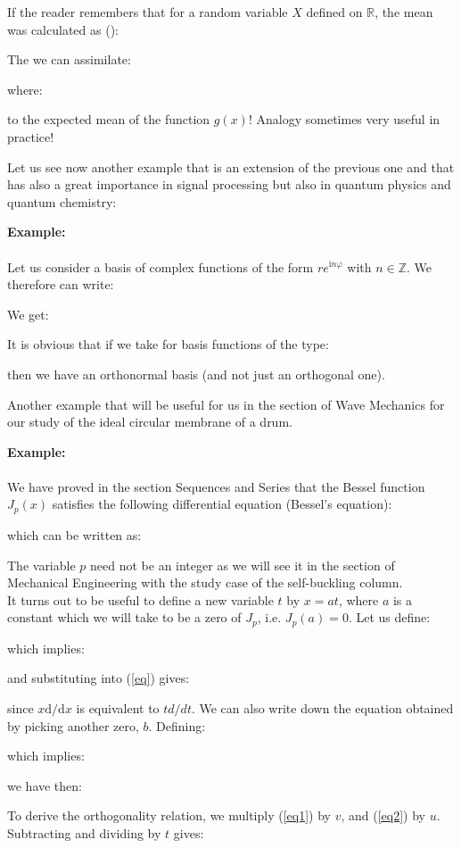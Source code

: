 	\begin{tcolorbox}[title=Remark,colframe=black,arc=10pt]
	If the reader remembers that for a random variable $X$ defined on $\mathbb{R}$, the mean was calculated as ():
	
	The we can assimilate:
	
	where:
	
	to the expected mean of the function $g(x)$! Analogy sometimes very useful in practice!
	\end{tcolorbox}
	Let us see now another example that is an extension of the previous one and that has also a great importance in signal processing but also in quantum physics and quantum chemistry:
	\begin{tcolorbox}[colframe=black,colback=white,sharp corners]
	\textbf{{\Large {}}Example:}\\\\
	Let us consider a basis of complex functions of the form $r e^{\mathrm{i}n\varphi}$ with $n\in\mathbb{Z}$. We therefore can write:
	
	We get:
	
	It is obvious that if we take for basis functions of the type:
	
	then we have an orthonormal basis (and not just an orthogonal one).
	\end{tcolorbox}
	Another example that will be useful for us in the section of Wave Mechanics for our study of the ideal circular membrane of a drum.
	\begin{tcolorbox}[colframe=black,colback=white,sharp corners]
	\textbf{{\Large {}}Example:}\\\\
	We have proved in the section Sequences and Series that the Bessel function $J_p(x)$ satisfies the following differential equation (Bessel's equation):
	
	which can be written as:
	
	The variable $p$ need not be an integer as we will see it in the section of Mechanical Engineering with the study case of the self-buckling column.\\
	
	It turns out to be useful to define a new variable $t$ by $x = a t$, where $a$ is a constant which we will take to be a zero of $J_p$, i.e. $J_p(a) = 0$. Let us define:
	
	which implies:
	
	and substituting into (\ref{eq}) gives:
	
	since $x \mathrm{d}/\mathrm{d}x$ is equivalent to $t d/dt$.
	We can also write down the equation obtained by picking another zero, $b$. Defining:
	
	which implies:
	
	we have then:
	
	To derive the orthogonality relation, we multiply (\ref{eq1}) by $v$, and (\ref{eq2}) by $u$. Subtracting and dividing by $t$ gives:
	\end{tcolorbox}
	

